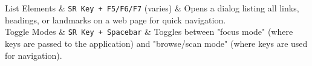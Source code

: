 \begin{longtblr}
	List Elements              & \texttt{SR Key + F5/F6/F7} (varies)                                   & Opens a dialog listing all links, headings, or landmarks on a web page for quick navigation.          \\
	Toggle Modes               & \texttt{SR Key + Spacebar}                                            & Toggles between "focus mode" (where keys are passed to the application) and "browse/scan mode" (where keys are used for navigation).     \\
\end{longtblr}
\normalsize
